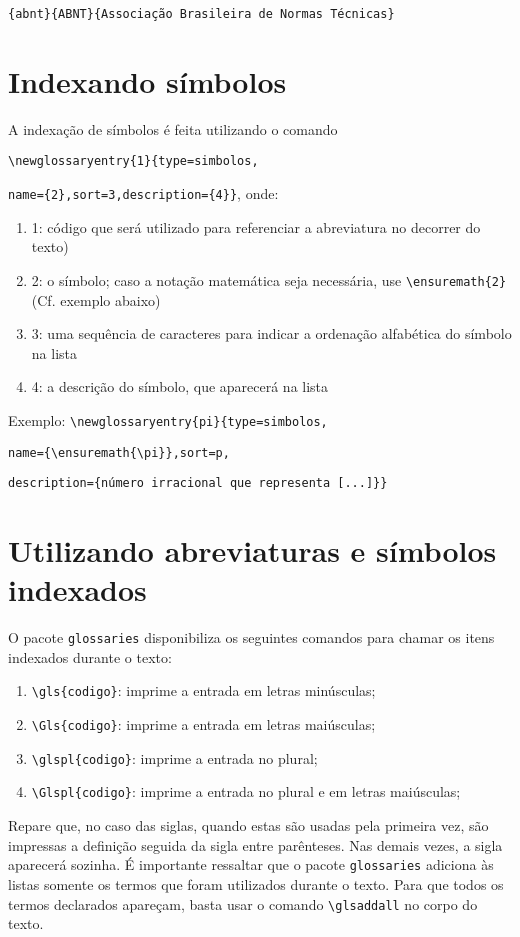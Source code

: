 \documentclass{fei}
\begin{document}
			 \verb+{abnt}{ABNT}{Associação Brasileira de Normas Técnicas}+
			 
	\section{Indexando símbolos}
	
	A indexação de símbolos é feita utilizando o comando
	
	\verb+\newglossaryentry{1}{type=simbolos,+
	
	\verb+name={2},sort=3,description={4}}+, onde:
	
	\begin{enumerate}
	\item 1: código que será utilizado para referenciar a abreviatura no decorrer do texto)
	\item 2: o símbolo; caso a notação matemática seja necessária, use \verb+\ensuremath{2}+ (Cf. exemplo abaixo)
	\item 3: uma sequência de caracteres para indicar a ordenação alfabética do símbolo na lista
	\item 4: a descrição do símbolo, que aparecerá na lista
	\end{enumerate}
	
	Exemplo: \verb+\newglossaryentry{pi}{type=simbolos,+
	
			 \verb+name={\ensuremath{\pi}},sort=p,+
			 
			 \verb+description={número irracional que representa [...]}}+

	\section{Utilizando abreviaturas e símbolos indexados}
	
	O pacote \verb+glossaries+ disponibiliza os seguintes comandos para chamar os itens indexados durante o texto:
	
	\begin{enumerate}
	\item \verb+\gls{codigo}+: imprime a entrada em letras minúsculas;
	\item \verb+\Gls{codigo}+: imprime a entrada em letras maiúsculas;
	\item \verb+\glspl{codigo}+: imprime a entrada no plural;
	\item \verb+\Glspl{codigo}+: imprime a entrada no plural e em letras maiúsculas;
	\end{enumerate}
	
	Repare que, no caso das siglas, quando estas são usadas pela primeira vez, são impressas a definição seguida da sigla entre parênteses. Nas demais vezes, a sigla aparecerá sozinha. É importante ressaltar que o pacote \texttt{glossaries} adiciona às listas somente os termos que foram utilizados durante o texto. Para que todos os termos declarados apareçam, basta usar o comando \verb+\glsaddall+ no corpo do texto.
	
\end{document}

